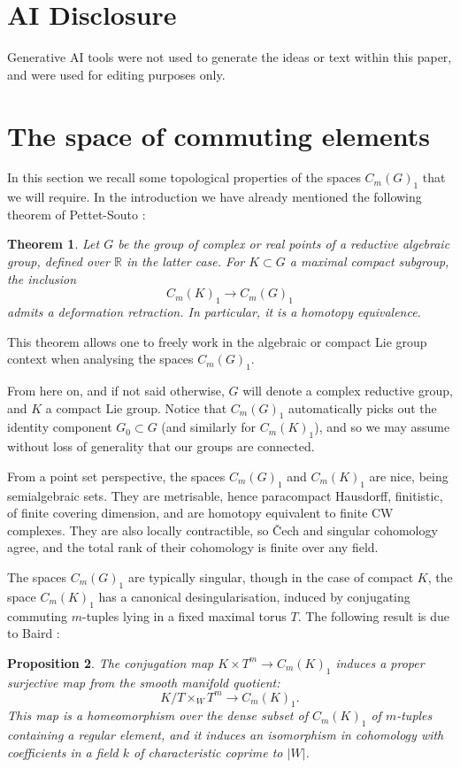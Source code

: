 \documentclass[oneside, 12pt, a4paper]{amsart}
\numberwithin{equation}{section}
\newcommand{\R}{\mathbb{R}}
\theoremstyle{plain}
\newtheorem{theorem}{Theorem}[section]
\newtheorem{proposition}[theorem]{Proposition}
\theoremstyle{definition}
\theoremstyle{remark}
\begin{document}
\section*{AI Disclosure}

Generative AI tools were not used to generate the ideas or text within this paper, and were used for editing purposes only.


\section{The space of commuting elements}

In this section we recall some topological properties of the spaces $C_m(G)_1$ that we will require. In the introduction we have already mentioned the following theorem of Pettet-Souto \cite{PettetSouto}:

\begin{theorem} \label{thm:pettetsouto}
    Let $G$ be the group of complex or real points of a reductive algebraic group, defined over $\R$ in the latter case. For $K\subset G$ a maximal compact subgroup, the inclusion \[C_m(K)_1\to C_m(G)_1\] admits a deformation retraction. In particular, it is a homotopy equivalence.
\end{theorem}

This theorem allows one to freely work in the algebraic or compact Lie group context when analysing the spaces $C_m(G)_1$. 

From here on, and if not said otherwise, $G$ will denote a complex reductive group, and $K$ a compact Lie group. Notice that $C_m(G)_1$ automatically picks out the identity component $G_0\subset G$ (and similarly for $C_m(K)_1$), and so we may assume without loss of generality that our groups are connected.

From a point set perspective, the spaces $C_m(G)_1$ and $C_m(K)_1$ are nice, being semialgebraic sets. They are metrisable, hence paracompact Hausdorff, finitistic, of finite covering dimension, and are homotopy equivalent to finite CW complexes. They are also locally contractible, so \v{C}ech and singular cohomology agree, and the total rank of their cohomology is finite over any field.

The spaces $C_m(G)_1$ are typically singular, though in the case of compact $K$, the space $C_m(K)_1$ has a canonical desingularisation, induced by conjugating commuting $m$-tuples lying in a fixed maximal torus $T$. The following result is due to Baird \cite{Baird}:

\begin{proposition}\label{prop:desing}
The conjugation map $K\times T^m\to C_m(K)_1$ induces a proper surjective map from the smooth manifold quotient: \[K/T\times_W T^m\to C_m(K)_1.\] This map is a homeomorphism over the dense subset of $C_m(K)_1$ of $m$-tuples containing a regular element, and it induces an isomorphism in cohomology with coefficients in a field $k$ of characteristic coprime to $|W|$.
\end{proposition}
\end{document}
